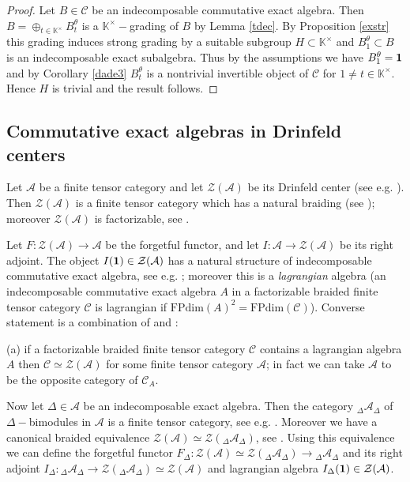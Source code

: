 \documentclass{amsart}
\theoremstyle{definition}
\newcommand{\C}{\mathcal{C}}
\newcommand{\K}{\mathbb{K}}
\newcommand{\cZ}{\mathcal{Z}}
\newcommand{\A}{\mathcal{A}}
\newcommand{\FP}{\text{FPdim}}
\newcommand{\be}{{\bf 1}}
\numberwithin{equation}{section}
\begin{document}
\begin{proof}
    Let $B\in \C$ be an indecomposable commutative exact algebra. Then 
    $B=\oplus_{t\in \K^\times}B_t^\theta$ is a $\K^\times -$grading of $B$ by Lemma \ref{tdec}.
    By Proposition \ref{exstr} this grading induces strong grading by a suitable
    subgroup $H\subset \K^\times$ and $B_1^\theta \subset B$ is an indecomposable exact subalgebra. Thus by the assumptions we have $B_1^\theta =\be$ and by Corollary
    \ref{dade3} $B_t^\theta$ is a nontrivial invertible object of $\C$ for $1\ne t\in \K^\times$. Hence $H$ is trivial and the result follows.
\end{proof}

\subsection{Commutative exact algebras in Drinfeld centers}
Let $\A$ be a finite tensor category and let $\cZ(\A)$ be its Drinfeld center (see e.g. \cite[7.13]{EGNO}). Then $\cZ(\A)$ is a finite tensor category which has a natural braiding
(see \cite[8.5]{EGNO}); moreover $\cZ(\A)$ is factorizable, see \cite[8.6]{EGNO}. 

Let $F:\cZ(\A)\to \A$ be the forgetful functor, and let $I: \A \to \cZ(\A)$ be its right 
adjoint. The object $I(\be)\in \cZ(\A)$ has a natural structure of indecomposable
commutative exact algebra, see e.g. \cite[Remark 6.10]{ShYa}; moreover this is a {\em lagrangian} algebra (an indecomposable commutative exact algebra $A$ in a factorizable
braided finite tensor category $\C$ is lagrangian if $\FP(A)^2=\FP(\C)$). Converse
statement is a combination of \cite[Corollary 5.14 (a)]{ShYa} and \cite[Corollary 5.18]{ShYa}:

(a) if a factorizable braided finite tensor category $\C$ contains a lagrangian algebra $A$
then $\C \simeq \cZ(\A)$ for some finite tensor category $\A$; in fact we can take $\A$ to
be the opposite category of $\C_A$.

Now let $\Delta \in \A$ be an indecomposable exact algebra. Then the category
$\phantom{}_\Delta \A_\Delta$ of $\Delta-$bimodules in $\A$ is a finite tensor category,
see e.g. \cite[Remark 7.12.5]{EGNO}. Moreover we have a canonical braided equivalence
$\cZ(\A)\simeq \cZ(\phantom{}_\Delta \A_\Delta)$, see \cite[Corollary 7.16.2]{EGNO}. 
Using this equivalence we can define
the forgetful functor $F_\Delta :\cZ(\A)\simeq \cZ(\phantom{}_\Delta \A_\Delta)\to \phantom{}_\Delta \A_\Delta$ and its right adjoint $I_\Delta : \phantom{}_\Delta \A_\Delta \to
\cZ(\phantom{}_\Delta \A_\Delta)\simeq \cZ(\A)$ and lagrangian algebra $I_\Delta(\be)\in \cZ(\A)$.
\end{document}
